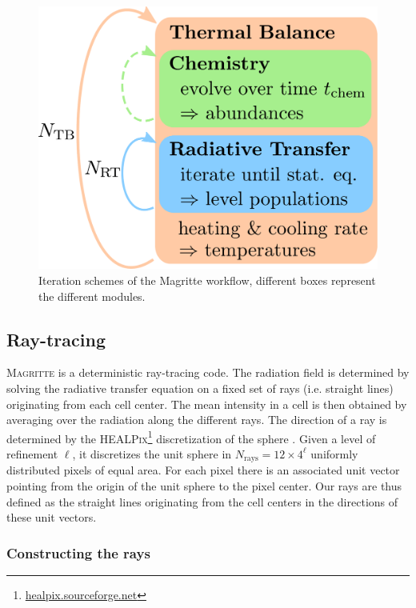 \documentclass[a4paper,fleqn,usenatbib]{mnras}
\begin{document}
\begin{figure}
	\centering
	\includegraphics[width=.9\columnwidth]{figures/scheme.pdf}
  \caption{Iteration schemes of the Magritte workflow, different boxes represent the different modules.}
  \label{scheme}
\end{figure}


\subsection{Ray-tracing}

\textsc{Magritte} is a deterministic ray-tracing code. The radiation field is determined by solving the radiative transfer equation on a fixed set of rays (i.e. straight lines) originating from each cell center. The mean intensity in a cell is then obtained by averaging over the radiation along the different rays. The direction of a ray is determined by the \textsc{HEALPix}\footnote{\href{http://healpix.sourceforge.net}{healpix.sourceforge.net}} discretization of the sphere \citep{Gorski2005}. Given a level of refinement $\ell$, it discretizes the unit sphere in $N_{\text{rays}}=12 \times 4^{\ell}$ uniformly distributed pixels of equal area. For each pixel there is an associated unit vector pointing from the origin of the unit sphere to the pixel center. Our rays are thus defined as the straight lines originating from the cell centers in the directions of these unit vectors.

\subsubsection{Constructing the rays}
\end{document}
